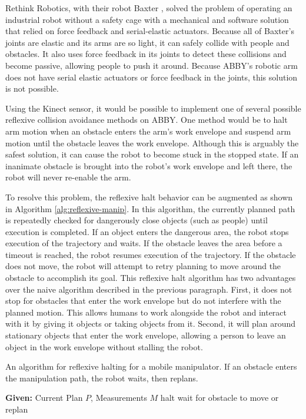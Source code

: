 \documentclass[]{cwru} %
\begin{document}
Rethink Robotics, with their robot Baxter \cite{rethink}, solved the problem of
operating an industrial robot without a safety cage with a mechanical
and software solution that relied on force feedback and serial-elastic
actuators. Because all of Baxter's joints are elastic and its arms are
so light, it can safely collide with people and obstacles. It also uses
force feedback in its joints to detect these collisions and become
passive, allowing people to push it around. Because ABBY's robotic arm
does not have serial elastic actuators or force feedback in the joints,
this solution is not possible.

Using the Kinect sensor, it would be possible to implement one of
several possible reflexive collision avoidance methods on ABBY. One
method would be to halt arm motion when an obstacle enters the arm's
work envelope and suspend arm motion until the obstacle leaves the work
envelope. Although this is arguably the safest solution, it can cause
the robot to become stuck in the stopped state. If an inanimate obstacle
is brought into the robot's work envelope and left there, the robot will
never re-enable the arm.

To resolve this problem, the reflexive halt behavior can be augmented as
shown in Algorithm \ref{alg:reflexive-manip}. In this algorithm, the currently planned path is
repeatedly checked for dangerously close objects (such as people) until
execution is completed. If an object enters the dangerous area, the
robot stops execution of the trajectory and waits. If the obstacle
leaves the area before a timeout is reached, the robot resumes execution
of the trajectory. If the obstacle does not move, the robot will attempt
to retry planning to move around the obstacle to accomplish its goal.
This reflexive halt algorithm has two advantages over the naive
algorithm described in the previous paragraph. First, it does not stop
for obstacles that enter the work envelope but do not interfere with the
planned motion. This allows humans to work alongside the robot and
interact with it by giving it objects or taking objects from it. Second,
it will plan around stationary objects that enter the work envelope,
allowing a person to leave an object in the work envelope without
stalling the robot.

\begin{algorithm}
\caption{An algorithm for reflexive halting for a mobile manipulator.
If an obstacle enters the manipulation path, the robot waits, then 
replans.}
\label{alg:reflexive-manip}
\begin{algorithmic}
\STATE \textbf{Given:} Current Plan $P$, Measurements $M$
      \STATE halt
      \STATE wait for obstacle to move or replan
    \ENDIF
  \ENDFOR
\ENDFOR
\end{algorithmic}
\end{algorithm}
\end{document}
